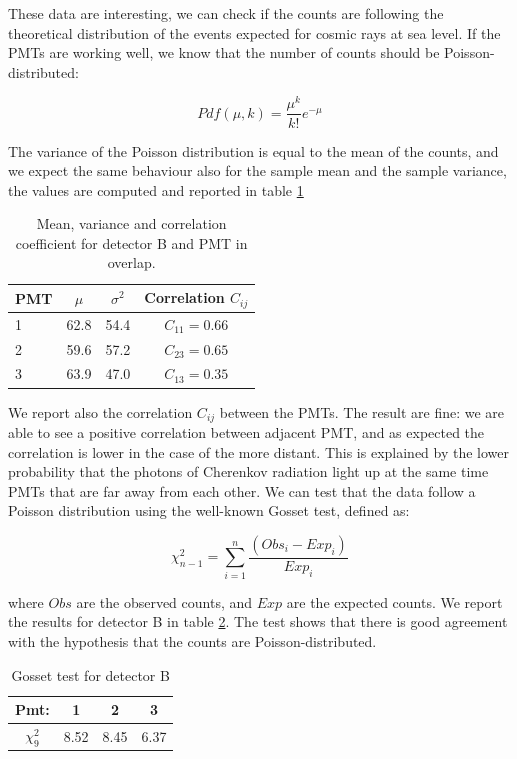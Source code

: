 These data are interesting, we can check if the counts are following the theoretical distribution of the events expected for cosmic rays at sea level. If the PMTs are working well, we know that the number of counts should be Poisson-distributed:

\begin{equation}
Pdf(\mu,k) =  \frac{\mu^{k}}{k!} e^{-\mu}
\end{equation}

The variance of the Poisson distribution is equal to the mean of the counts, and we expect the same behaviour also for the sample mean and the sample variance, the values are computed and reported in table \ref{tab:Bcounts}

\begin{table}[ht]
\centering
\begin{tabular}{l|c|c|c}
\hline 
PMT & $\mu$ & $\sigma^{2}$ & Correlation $C_{ij}$ \\
\hline
1 	& 62.8	& 54.4	& $C_{11} = 0.66$\\
2 	& 59.6	& 57.2	& $C_{23} = 0.65$\\
3	& 63.9	& 47.0  & $C_{13} = 0.35$\\
\hline
\end{tabular}
\caption{Mean, variance and correlation coefficient for detector B and PMT in overlap.}
\label{tab:Bcounts}
\end{table}

We report also the correlation $C_{ij}$ between the PMTs. The result are fine: we are able to see a positive correlation between adjacent PMT, and as expected the correlation is lower in the case of the more distant. This is explained by the lower probability that the photons of Cherenkov radiation light up at the same time PMTs that are far away from each other.
We can test that the data follow a Poisson distribution using the well-known Gosset test, defined as:

\begin{equation}
\chi^{2}_{n-1} = \sum_{i = 1}^{n} \dfrac{(Obs_{i} - Exp_{i})}{Exp_{i}}
\end{equation}

where $Obs$ are the observed counts, and $Exp$ are the expected counts.
We report the results for detector B in table \ref{tab:GossetB}. The test shows that there is good agreement with the hypothesis that the counts are Poisson-distributed.

\begingroup
\setlength{\tabcolsep}{8pt} %
\renewcommand{\arraystretch}{1.2} %
\begin{table}[htb]
\centering
\begin{tabular}{c|c|c|c}
\hline 
Pmt: & 1 & 2 & 3 \\ 
\hline
$\chi^{2}_{9}$ & 8.52 & 8.45 & 6.37 \\ 
\hline
\end{tabular}
\caption{Gosset test for detector B}
\label{tab:GossetB} 
\end{table}
\endgroup

